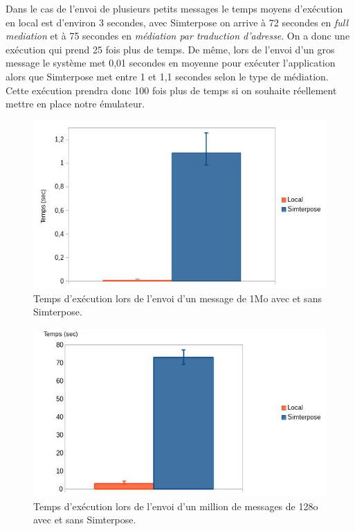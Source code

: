 Dans le cas de l'envoi de plusieurs petits messages le temps moyens d'exécution en local est d'environ 3 secondes, avec Simterpose on arrive à 72 secondes en \textit{full mediation} et à 75 secondes en \textit{médiation par traduction d'adresse}. On a donc une exécution qui prend 25 fois plus de temps. De même, lors de l'envoi d'un gros message le système met 0,01 secondes en moyenne pour exécuter l'application alors que Simterpose met entre 1 et 1,1 secondes selon le type de médiation. Cette exécution prendra donc 100 fois plus de temps si on souhaite réellement mettre en place notre émulateur.

\begin{figure}
  \centering
    \includegraphics[scale=0.5]{mesures/graph/Bigmsg_local.jpg}
    \caption{Temps d'exécution lors de l'envoi d'un message de 1Mo avec et sans Simterpose.}
    \label{Network_Big_Local}
\end{figure}

\begin{figure}
  \centering
    \includegraphics[scale=0.5]{mesures/graph/Littlemsg_local.jpg}
    \caption{Temps d'exécution lors de l'envoi d'un million de messages de 128o avec et sans Simterpose.}
    \label{Network_Little_Local}
\end{figure}
  

